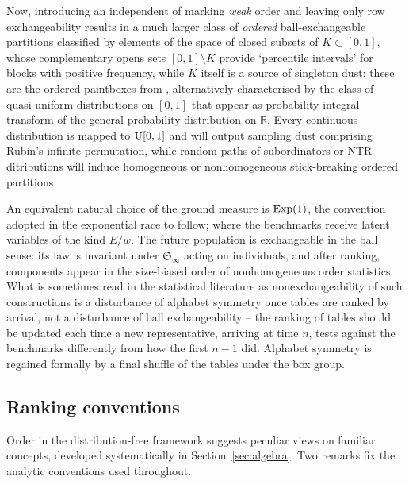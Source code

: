 \documentclass[11pt]{article}
\theoremstyle{plain}
\theoremstyle{definition}
\begin{document}
Now, introducing an independent of marking {\it weak} order and leaving only
 row exchangeability results in a much larger class of {\it ordered} ball-exchangeable partitions classified by elements of  the space of closed subsets of $K\subset [0,1]$, whose complementary opens sets $[0,1]\setminus K$ provide `percentile intervals'  for blocks with positive frequency, while $K$ itself is a source 
of singleton dust: these are the ordered paintboxes from
 \cite{GnedinRepresentationofCompositionStructures}, alternatively characterised by the class of quasi-uniform distributions on $[0,1]$ that appear as probability integral transform of the general probability distribution on 
${\mathbb R}$. Every continuous distribution is mapped to ${\rm U}[0,1]$ and will output sampling dust
comprising Rubin's infinite permutation,
while random paths of subordinators or NTR ditributions will induce homogeneous or nonhomogeneous stick-breaking ordered partitions.


An equivalent natural choice of the ground measure is ${\rm Exp}(1)$, 
the convention adopted in the exponential race to follow; where the benchmarks receive latent variables
of the kind $E/w$.
The future population is exchangeable in the ball sense: its law is invariant under \(\mathfrak S_\infty\) acting on individuals, and after ranking, components appear in the size-biased order of nonhomogeneous order statistics. What is sometimes read in the statistical literature as nonexchangeability of such constructions is a disturbance of alphabet symmetry once tables are ranked by arrival, not a disturbance of ball exchangeability -- the ranking of tables should be updated each time a new representative, arriving at time \(n\), tests against the benchmarks differently from how the first \(n-1\) did. Alphabet symmetry is regained formally by a final shuffle of the tables under the box group.



\subsection{Ranking conventions}

Order in the distribution-free framework suggests peculiar views on familiar concepts, developed systematically in Section~\ref{sec:algebra}. Two remarks fix the analytic conventions used throughout.
\end{document}
